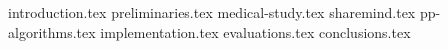 \documentclass[inscr,ack]{dithesis}
\begin{document}
\frontmatter

\mainmatter


{introduction.tex}
{preliminaries.tex}
{medical-study.tex}
{sharemind.tex}
{pp-algorithms.tex}
{implementation.tex}
{evaluations.tex}
{conclusions.tex}


\backmatter
\end{document}
